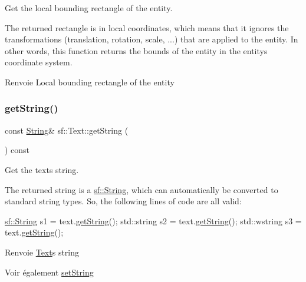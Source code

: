 Get the local bounding rectangle of the entity. 

The returned rectangle is in local coordinates, which means that it ignores the transformations (translation, rotation, scale, ...) that are applied to the entity. In other words, this function returns the bounds of the entity in the entity\textquotesingle{}s coordinate system.

\begin{DoxyReturn}{Renvoie}
Local bounding rectangle of the entity 
\end{DoxyReturn}
\mbox{\label{classsf_1_1Text_a084c275eb4bca835696af5f8f9c80ab3}} 
\subsubsection{\texorpdfstring{get\+String()}{getString()}}
{\footnotesize\ttfamily const \hyperlink{classsf_1_1String}{String}\& sf\+::\+Text\+::get\+String (\begin{DoxyParamCaption}{ }\end{DoxyParamCaption}) const}



Get the text\textquotesingle{}s string. 

The returned string is a \hyperlink{classsf_1_1String}{sf\+::\+String}, which can automatically be converted to standard string types. So, the following lines of code are all valid\+: 
\begin{DoxyCode}
\hyperlink{classsf_1_1String}{sf::String}   s1 = text.\hyperlink{classsf_1_1Text_a084c275eb4bca835696af5f8f9c80ab3}{getString}();
std::string  s2 = text.\hyperlink{classsf_1_1Text_a084c275eb4bca835696af5f8f9c80ab3}{getString}();
std::wstring s3 = text.\hyperlink{classsf_1_1Text_a084c275eb4bca835696af5f8f9c80ab3}{getString}();
\end{DoxyCode}


\begin{DoxyReturn}{Renvoie}
\hyperlink{classsf_1_1Text}{Text}\textquotesingle{}s string
\end{DoxyReturn}
\begin{DoxySeeAlso}{Voir également}
\hyperlink{classsf_1_1Text_a7d3b3359f286fd9503d1ced25b7b6c33}{set\+String} 
\end{DoxySeeAlso}
\mbox{\label{classsf_1_1Text_a0da79b0c057f4bb51592465a205c35d7}} 
